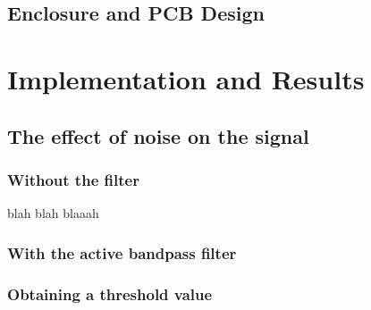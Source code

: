 \documentclass[12pt]{article}
\begin{document}
\subsection{Enclosure and PCB Design}

	




\newpage
\section{Implementation and Results}

\subsection{The effect of noise on the signal}

\subsubsection{Without the filter}
blah blah blaaah

\subsubsection{With the active bandpass filter}


\subsubsection{Obtaining a threshold value}
\end{document}
